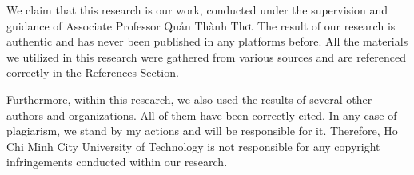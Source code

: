 \documentclass[12pt,a4paper,oneside]{book} %
\begin{document}

\coverpage

\frontmatter



\begin{declaration}




We claim that this research is our work, conducted under the supervision and guidance of Associate Professor Quản Thành Thơ. The result of our research is authentic and has never been published in any platforms before. All the materials we utilized in this research were gathered from various sources and are referenced correctly in the References Section. 

Furthermore, within this research, we also used the results of several other authors and organizations. All of them have been correctly cited. In any case of plagiarism, we stand by my actions and will be responsible for it. Therefore, Ho Chi Minh City University of Technology is not responsible for any copyright infringements conducted within our research.

\end{declaration}
\end{document}
